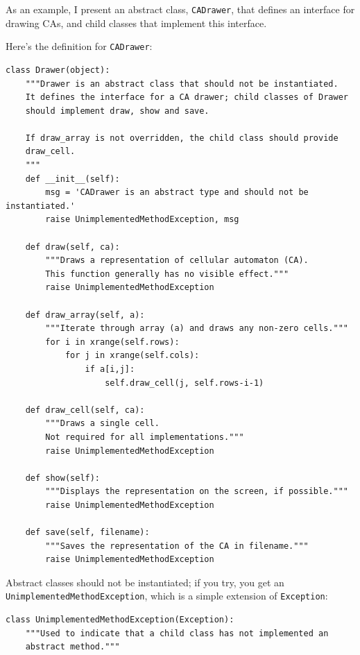 \documentclass[10pt]{book}
\begin{document}
As an example, I present an abstract class, {\tt CADrawer},
that defines an interface for drawing CAs, and child classes
that implement this interface.

Here's the definition for {\tt CADrawer}:

\begin{verbatim}
class Drawer(object):
    """Drawer is an abstract class that should not be instantiated.
    It defines the interface for a CA drawer; child classes of Drawer
    should implement draw, show and save.

    If draw_array is not overridden, the child class should provide
    draw_cell.
    """
    def __init__(self):
        msg = 'CADrawer is an abstract type and should not be instantiated.'
        raise UnimplementedMethodException, msg

    def draw(self, ca):
        """Draws a representation of cellular automaton (CA).
        This function generally has no visible effect."""
        raise UnimplementedMethodException

    def draw_array(self, a):
        """Iterate through array (a) and draws any non-zero cells."""
        for i in xrange(self.rows):
            for j in xrange(self.cols):
                if a[i,j]:
                    self.draw_cell(j, self.rows-i-1)

    def draw_cell(self, ca):
        """Draws a single cell.
        Not required for all implementations."""
        raise UnimplementedMethodException

    def show(self):
        """Displays the representation on the screen, if possible."""
        raise UnimplementedMethodException

    def save(self, filename):
        """Saves the representation of the CA in filename."""
        raise UnimplementedMethodException
\end{verbatim}

Abstract classes should not be instantiated; if you try, you
get an {\tt UnimplementedMethodException}, which is a simple
extension of {\tt Exception}:

\begin{verbatim}
class UnimplementedMethodException(Exception):
    """Used to indicate that a child class has not implemented an
    abstract method."""
\end{verbatim}
\end{document}
